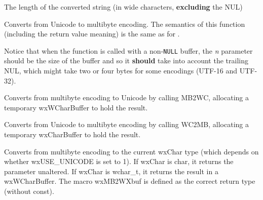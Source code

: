


The length of the converted string (in wide characters, {\bf excluding} the NUL)

\label{wxmbconvwc2mb}


Converts from Unicode to multibyte encoding. The semantics of this function
(including the return value meaning) is the same as for 
.

Notice that when the function is called with a non-{\tt NULL} buffer, the 
{\it n} parameter should be the size of the buffer and so it {\bf should} take
into account the trailing NUL, which might take two or four bytes for some
encodings (UTF-16 and UTF-32).

\label{wxmbconvcmb2wc}


Converts from multibyte encoding to Unicode by calling MB2WC,
allocating a temporary wxWCharBuffer to hold the result.

\label{wxmbconvcwc2mb}


Converts from Unicode to multibyte encoding by calling WC2MB,
allocating a temporary wxCharBuffer to hold the result.

\label{wxmbconvcmb2wx}



Converts from multibyte encoding to the current wxChar type
(which depends on whether wxUSE\_UNICODE is set to 1). If wxChar is char,
it returns the parameter unaltered. If wxChar is wchar\_t, it returns the
result in a wxWCharBuffer. The macro wxMB2WXbuf is defined as the correct
return type (without const).

